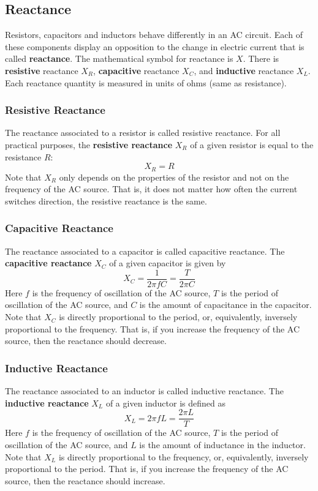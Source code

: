 \subsection{Reactance}
%
Resistors, capacitors and inductors behave differently in an AC circuit. Each of these components display an opposition to the change in electric current that is called \textbf{reactance}. The mathematical symbol for reactance is $X$. There is \textbf{resistive} reactance $X_{R}$, \textbf{capacitive} reactance $X_{C}$, and \textbf{inductive} reactance $X_{L}$. Each reactance quantity is measured in units of ohms (same as resistance).
%
\subsubsection{Resistive Reactance}
%
The reactance associated to a resistor is called resistive reactance. For all practical purposes, the \textbf{resistive reactance} $X_{R}$ of a given resistor is equal to the resistance $R$:
\begin{equation} \label{eq.06.reactance.R}
	X_{R} = R
\end{equation}
Note that $X_{R}$ only depends on the properties of the resistor and not on the frequency of the AC source. That is, it does not matter how often the current switches direction, the resistive reactance is the same.
%
\subsubsection{Capacitive Reactance}
%
The reactance associated to a capacitor is called capacitive reactance. The \textbf{capacitive reactance} $X_{C}$ of a given capacitor is given by
\begin{equation} \label{eq.06.reactance.C}
	X_{C} = \frac{1}{2 \pi f C} = \frac{T}{2 \pi C}
\end{equation}
Here $f$ is the frequency of oscillation of the AC source, $T$ is the period of oscillation of the AC source, and $C$ is the amount of capacitance in the capacitor. Note that $X_{C}$ is directly proportional to the period, or, equivalently, inversely proportional to the frequency. That is, if you increase the frequency of the AC source, then the reactance should decrease.
%
\subsubsection{Inductive Reactance}
%
The reactance associated to an inductor is called inductive reactance. The \textbf{inductive reactance} $X_{L}$ of a given inductor is defined as
\begin{equation} \label{eq.06.reactance.L}
	X_{L} = 2 \pi f L = \frac{2 \pi L}{T}
\end{equation}
Here $f$ is the frequency of oscillation of the AC source, $T$ is the period of oscillation of the AC source, and $L$ is the amount of inductance in the inductor. Note that $X_{L}$ is directly proportional to the frequency, or, equivalently, inversely proportional to the period. That is, if you increase the frequency of the AC source, then the reactance should increase.
%
